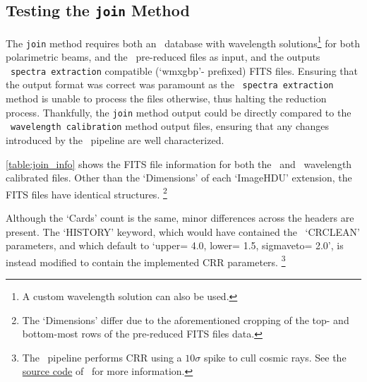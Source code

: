 \subsection{Testing the \texttt{join} Method} \label{subsec:test_join}

The \texttt{join} method requires both an \iraf\ database with wavelength solutions\footnote{A custom wavelength solution can also be used.} for both polarimetric beams, and the \polsalt\ pre-reduced files as input,  and the outputs \polsalt\ \texttt{spectra extraction} compatible (`wmxgbp'- prefixed) \gls{FITS} files.
Ensuring that the output format was correct was paramount as the \polsalt\ \texttt{spectra extraction} method is unable to process the files otherwise, thus halting the reduction process.
Thankfully, the \texttt{join} method output could be directly compared to the \polsalt\ \texttt{wavelength calibration} method output files, ensuring that any changes introduced by the \stops\ pipeline are well characterized.



\autoref{table:join_info} shows the \gls{FITS} file information for both the \polsalt\ and \stops\ wavelength calibrated files.
Other than the `Dimensions' of each `ImageHDU' extension, the \gls{FITS} files have identical structures.%
\footnote{The `Dimensions' differ due to the aforementioned cropping of the top- and bottom-most rows of the pre-reduced \gls{FITS} files data.}

Although the `Cards' count is the same, minor differences across the headers are present.
The `HISTORY' keyword, which would have contained the \polsalt\ `CRCLEAN' parameters, and which default to `upper= 4.0, lower= 1.5, sigmaveto= 2.0', is instead modified to contain the implemented \gls{CRR} parameters.%
\footnote{The \polsalt\ pipeline performs \gls{CRR} using a $10\sigma$ spike to cull cosmic rays. See the \protect\href{https://github.com/saltastro/polsalt/blob/master/polsalt/specpolwavmap.py\#L132}{source code} of \polsalt\ for more information.}

